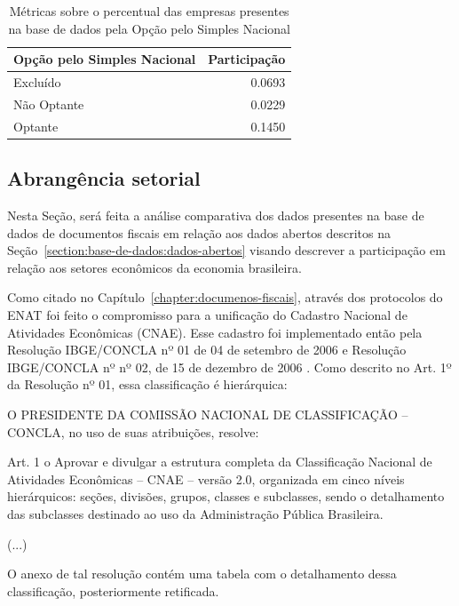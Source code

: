 \begin{table}[htb]
\centering
\caption{Métricas sobre o percentual das empresas presentes na base de dados pela Opção pelo Simples Nacional}
\label{tab:participacao-por-simples-nacional}
\begin{tabular}{lr}
\toprule
Opção pelo Simples Nacional & Participação \\
\midrule
Excluído     &    0.0693 \\
Não Optante  &    0.0229 \\
Optante      &    0.1450 \\
\bottomrule
\end{tabular}
\fdadospesquisa
\end{table}

\subsection{Abrangência setorial}

Nesta Seção, será feita a análise comparativa dos dados presentes na base de dados de documentos fiscais em relação aos dados abertos descritos na Seção~\ref{section:base-de-dados:dados-abertos} visando descrever a participação em relação aos setores econômicos da economia brasileira.

Como citado no Capítulo~\ref{chapter:documenos-fiscais}, através dos protocolos do ENAT foi feito o compromisso para a unificação do Cadastro Nacional de Atividades Econômicas (CNAE). Esse cadastro foi implementado então pela Resolução IBGE/CONCLA  nº 01 de 04 de setembro de 2006 \cite{resolucao-concla:01:cnae} e Resolução IBGE/CONCLA nº nº 02, de 15 de dezembro de 2006 \cite{resolucao-concla:02:cnae}. Como descrito no Art. 1º da Resolução nº 01, essa classificação é hierárquica:

\begin{citacao}
O PRESIDENTE DA COMISSÃO NACIONAL DE CLASSIFICAÇÃO –
CONCLA, no uso de suas atribuições, resolve:

Art. 1 o Aprovar e divulgar a estrutura completa da Classificação Nacional de Atividades Econômicas – CNAE – versão 2.0, organizada em cinco níveis hierárquicos: seções, divisões, grupos, classes e subclasses, sendo o detalhamento das subclasses destinado ao uso da Administração Pública Brasileira.

(...)
\end{citacao}

O anexo de tal resolução contém uma tabela com o detalhamento dessa classificação, posteriormente retificada.

